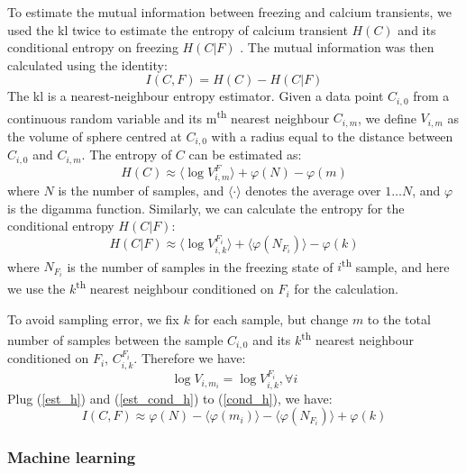 To estimate the mutual information between freezing and calcium transients, we used the \gls{kl} twice to estimate the entropy of calcium transient $H(C)$ and its conditional entropy on freezing $H(C|F)$ \citep{ross14, victor02}. The mutual information was then calculated using the identity:
\begin{equation} \label{cond_h}
    I(C, F) = H(C) - H(C|F)
\end{equation}
The \gls{kl} is a nearest-neighbour entropy estimator. Given a data point $C_{i,0}$ from a continuous random variable and its m\textsuperscript{th} nearest neighbour $C_{i,m}$, we define $V_{i,m}$ as the volume of sphere centred at $C_{i,0}$ with a radius equal to the distance between $C_{i,0}$ and $C_{i,m}$. The entropy of $C$ can be estimated as:
\begin{equation} \label{est_h}
    H(C) \approx \langle \log V_{i,m}^F\rangle + \varphi(N) - \varphi(m)
\end{equation}
where $N$ is the number of samples, and $\langle\cdot\rangle$ denotes the average over $1\ldots N$, and $\varphi$ is the digamma function. Similarly, we can calculate the entropy for the conditional entropy $H(C|F)$:
\begin{equation} \label{est_cond_h}
    H(C|F) \approx \langle \log V_{i,k}^{F_i} \rangle + \langle \varphi(N_{F_i}) \rangle - \varphi(k)
\end{equation}
where $N_{F_i}$ is the number of samples in the freezing state of $i$\textsuperscript{th} sample, and here we use the $k$\textsuperscript{th} nearest neighbour conditioned on $F_i$ for the calculation.

To avoid sampling error, we fix $k$ for each sample, but change $m$ to the total number of samples between the sample $C_{i,0}$ and its $k$\textsuperscript{th} nearest neighbour conditioned on $F_i$, $C_{i,k}^{F_i}$. Therefore we have:
\begin{equation*}
\log V_{i, m_i} = \log V_{i, k}^{F_i}, \forall i 
\end{equation*}
Plug (\ref{est_h}) and (\ref{est_cond_h}) to (\ref{cond_h}), we have:
\begin{equation*}
    I(C, F) \approx \varphi(N) - \langle\varphi(m_i)\rangle - \langle\varphi(N_{F_i})\rangle + \varphi(k)
\end{equation*}




\subsubsection{Machine learning}

